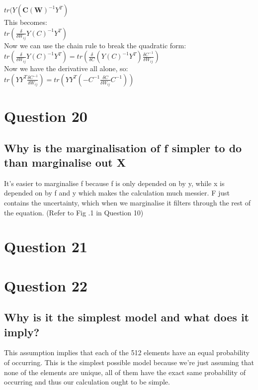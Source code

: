 \documentclass[a4paper, 9pt]{article}
\begin{document}
\( tr(Y (\mathbf{C}(\mathbf{W})^{-1}Y^T) \) \\
\newline
This becomes: \\

\( tr(\frac{\delta}{\delta W_{ij}} Y(C)^{-1}Y^T) \) \\
\newline
Now we can use the chain rule to break the quadratic form: \\

\( tr(\frac{\delta}{\delta W_{ij}} Y(C)^{-1}Y^T) = tr(\frac{\delta}{\delta C} (Y(C)^{-1}Y^T) \frac{\delta C^{-1}}{\delta W_{ij}} ) \) \\
\newline
Now we have the derivative all alone, so: \\ 

\( tr(Y Y^T \frac{\delta C^{-1}}{\delta W_{ij}}) = tr(Y Y^T ( -C^{-1} \frac{\delta C}{\delta W_{ij}} C^{-1})) \)

\section*{Question 20}
\subsection*{Why is the marginalisation of f simpler to do than marginalise out X}
It's easier to marginalise f because f is only depended on by y, while x is depended on by f and y which makes the calculation much messier. F just contains the uncertainty, which when we marginalise it filters through the rest of the equation. (Refer to Fig .1 in Question 10)

\section*{Question 21}

\section*{Question 22}
\subsection*{Why is it the simplest model and what does it imply?}
This assumption implies that each of the 512 elements have an equal probability of occurring.
This is the simplest possible model because we're just assuming that none of the elements are unique, all of them have the exact same probability of occurring and thus our calculation ought to be simple.
\end{document}
